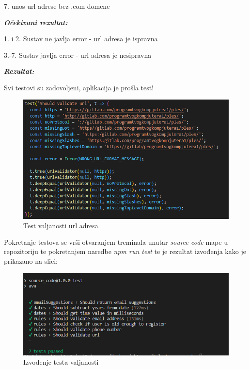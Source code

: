              7. unos url adrese bez .com domene

             \textbf{\textit{Očekivani rezultat:}}

             1. i 2. Sustav ne javlja error - url adresa je ispravna

             3.-7. Sustav  javlja error - url adresa je nesipravna

             \textbf{\textit{Rezultat:}}

             Svi testovi su zadovoljeni, aplikacija je prošla test!

\begin{figure}[H]
			\includegraphics[scale=0.5]{slike/urlTest.PNG} %
			\centering
			\caption{Test valjanosti url adresa}
			\label{fig:ajoj}
			
		\end{figure}

Pokretanje testova se vrši otvaranjem treminala unutar \textit{source code} mape u repozitoriju te pokretanjem naredbe \textit{npm run test} te je rezultat izvođenja kako je prikazano na slici:

\begin{figure}[H]
			\includegraphics[scale=0.5]{slike/result.PNG} %
			\centering
			\caption{Izvođenje testa valjanosti}
			\label{fig:rez}
			\end{figure}


